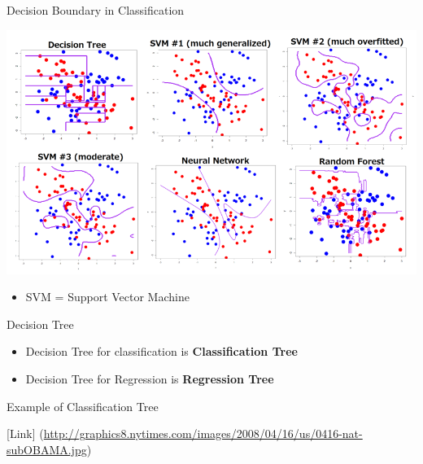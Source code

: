 \documentclass[
  ignorenonframetext,
]{beamer}
\providecommand{\tightlist}{%
  \setlength{\itemsep}{0pt}\setlength{\parskip}{0pt}}
\begin{document}
\begin{frame}{Decision Boundary in Classification}
\protect\hypertarget{decision-boundary-in-classification-2}{}

\includegraphics{images2/db1.png}

\begin{itemize}
\tightlist
\item
  SVM = Support Vector Machine
\end{itemize}

\end{frame}

\begin{frame}{Decision Tree}
\protect\hypertarget{decision-tree}{}

\begin{itemize}
\tightlist
\item
  Decision Tree for classification is \textbf{Classification Tree}
\item
  Decision Tree for Regression is \textbf{Regression Tree}
\end{itemize}

\end{frame}

\begin{frame}{Example of Classification Tree}
\protect\hypertarget{example-of-classification-tree}{}

{[}Link{]}
(\url{http://graphics8.nytimes.com/images/2008/04/16/us/0416-nat-subOBAMA.jpg})

\end{frame}
\end{document}
